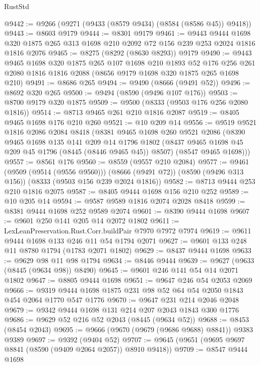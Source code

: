 \begin{lexlean}{RustStd}
\begin{coremodule}
@9442 := @9266 (@9271 (@9433 (@8579 @9434) (@8584 (@8586 @45)) @9418))
@9443 := @8603 @9179
@9444 := @8301 @9179
@9461 := @9443
    @9444
    @1698
    @320
    @1875
    @265
    @313
    @1698
    @210
    @2092
    @72
    @156
    @239
    @253
    @2024
    @1816
    @1816
    @2076
@9465 := @8275 (@8292 (@8630 @8293)) @9179
@9490 := @9443
    @9465
    @1698
    @320
    @1875
    @265
    @107
    @1698
    @210
    @1893
    @52
    @176
    @256
    @261
    @2080
    @1816
    @1816
    @2088
    (@8656 @9179 @1698 @320 @1875 @265 @1698 @210)
@9491 := @8686 @265
@9494 := @9490 (@8666 (@9491 @52))
@9496 := @8692 @320 @265
@9500 := @9494 (@8590 (@9496 @107 @176))
@9503 := @8700 @9179 @320 @1875
@9509 := @9500 (@8333 (@9503 @176 @256 @2080 @1816))
@9514 := @8713 @9465 @261 @210 @1816 @2087
@9519 := @8405 @9465 @1698 @176 @210 @260
@9521 := @10 @209 @14
@9556 := @9519
    @9521
    @1816
    @2086
    @2084
    @8418
    (@8381
      @9465
      @1698
      @260
      @9521
      @2086
      (@8390
        @9465
        @1698
        @135
        @141
        @209
        @14
        @1796
        @1802
        (@8437 @9465 @1698 @45 @209 @45 @1796 (@8445 (@8446 @9465 @45)) @8507)
        (@8547 @9465 @1698)))
@9557 := @8561 @176
@9560 := @8559 (@9557 @210 @2084)
@9577 := @9461
    (@9509 (@9514 (@9556 @9560)))
    (@8666 (@9491 @72))
    (@8590 (@9496 @313 @156))
    (@8333 (@9503 @156 @239 @2024 @1816))
@9582 := @8713 @9444 @253 @210 @1816 @2075
@9587 := @8405 @9444 @1698 @156 @210 @252
@9589 := @10 @205 @14
@9594 := @9587 @9589 @1816 @2074 @2028 @8418
@9599 := @8381 @9444 @1698 @252 @9589 @2074
@9601 := @8390 @9444 @1698
@9607 := @9601 @250 @141 @205 @14 @2072 @1802
@9611 := LexLeanPreservation.Rust.Corr.buildPair @7970 @7972 @7974
@9619 := @9611 @9444 @1698 @133 @246 @11 @54 @1794 @2071
@9627 := @9601 @133 @248 @11 @8780 @1794 (@1783 @2071 @1802)
@9629 := @8437 @9444 @1698
@9633 := @9629 @98 @11 @98 @1794
@9634 := @8446 @9444
@9639 := @9627 (@9633 (@8445 (@9634 @98)) @8490)
@9645 := @9601 @246 @141 @54 @14 @2071 @1802
@9647 := @8805 @9444 @1698
@9651 := @9647 @246 @54 @2053 @2069
@9666 := @9319 @9444 @1698 @1875 @231 @98 @52 @64 @54 @2050 @1843 @454 @2064 @1770 @547 @1776
@9670 := @9647 @231 @214 @2046 @2048
@9679 := @9342 @9444 @1698 @131 @214 @207 @2043 @1843 @300 @1776
@9686 := @9629 @52 @216 @52 @2043 (@8445 (@9634 @52))
@9688 := @8453 (@8454 @2043)
@9695 := @9666 (@9670 (@9679 (@9686 @9688) @8841)) @9383 @9389
@9697 := @9392 (@9404 @52)
@9707 := @9645 (@9651 (@9695 @9697 @8841 (@8590 (@9409 @2064 @2057)) @8910 @9418))
@9709 := @8547 @9444 @1698

\end{coremodule}
\end{lexlean}
